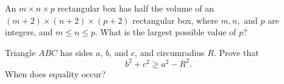 \documentclass{article}
\begin{document}
\begin{prob}[AIME 1998/14]{9}
An $m\times n\times p$ rectangular box has half the volume of an $(m + 2)\times(n + 2)\times(p + 2)$ rectangular box, where $m, n,$ and $p$ are integers, and $m\le n\le p.$ What is the largest possible value of $p$?
\end{prob} 

\begin{prob}[]{13}
Triangle $ABC$ has sides $a$, $b$, and $c$, and circumradius $R$. Prove that
\[b^2 + c^2 \ge a^2 - R^2.\]
When does equality occur?
\end{prob}

\end{document}
